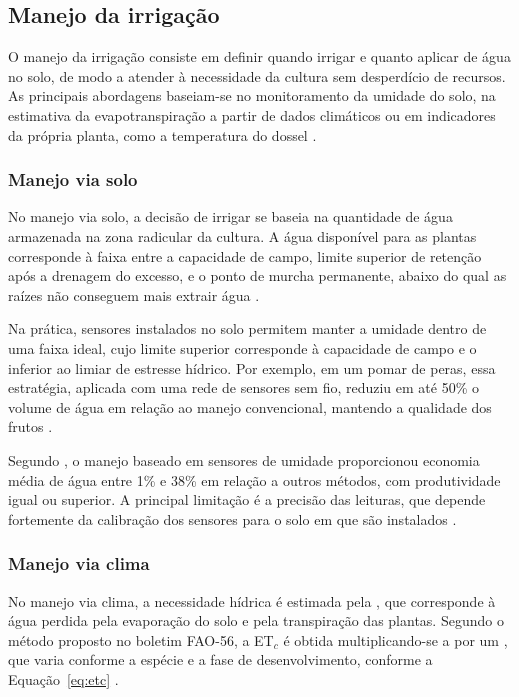 \subsection{Manejo da irrigação}

O manejo da irrigação consiste em definir quando irrigar e quanto aplicar de água no solo, de modo a atender à necessidade da cultura sem desperdício de recursos. As principais abordagens baseiam-se no monitoramento da umidade do solo, na estimativa da evapotranspiração a partir de dados climáticos ou em indicadores da própria planta, como a temperatura do dossel \cite{datta2023}.

\subsubsection{Manejo via solo}

No manejo via solo, a decisão de irrigar se baseia na quantidade de água armazenada na zona radicular da cultura. A água disponível para as plantas corresponde à faixa entre a capacidade de campo, limite superior de retenção após a drenagem do excesso, e o ponto de murcha permanente, abaixo do qual as raízes não conseguem mais extrair água \cite{allen1998}.

Na prática, sensores instalados no solo permitem manter a umidade dentro de uma faixa ideal, cujo limite superior corresponde à capacidade de campo e o inferior ao limiar de estresse hídrico. Por exemplo, em um pomar de peras, essa estratégia, aplicada com uma rede de sensores sem fio, reduziu em até 50\% o volume de água em relação ao manejo convencional, mantendo a qualidade dos frutos \cite{hamouda2024}.

Segundo , o manejo baseado em sensores de umidade proporcionou economia média de água entre 1\% e 38\% em relação a outros métodos, com produtividade igual ou superior. A principal limitação é a precisão das leituras, que depende fortemente da calibração dos sensores para o solo em que são instalados \cite{datta2023}.

\subsubsection{Manejo via clima}


No manejo via clima, a necessidade hídrica é estimada pela
, que corresponde à água perdida
pela evaporação do solo e pela transpiração das plantas. Segundo o método
proposto no boletim FAO-56, a ET$_c$ é obtida multiplicando-se a
 por um
, que varia conforme a espécie e a fase de
desenvolvimento, conforme a Equação~\ref{eq:etc} \cite{allen1998}.
 
